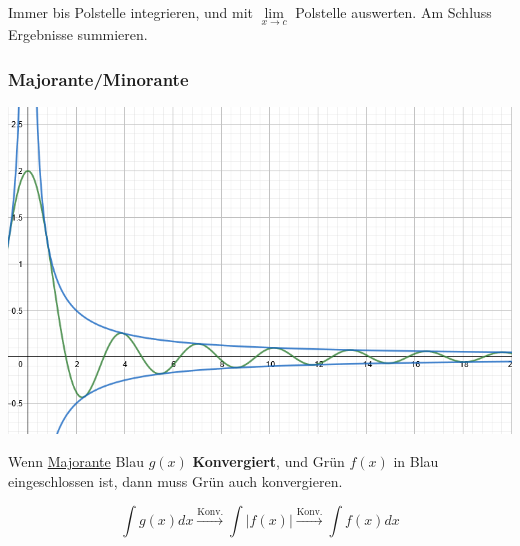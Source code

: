 \noindent Immer bis Polstelle integrieren, und mit $\lim\limits_{x\rightarrow c}$ Polstelle auswerten. Am Schluss Ergebnisse summieren.

\subsubsection{Majorante/Minorante}
\begin{center}
	\begin{minipage}{0.2\textwidth}
		\includegraphics[width=\linewidth]{Images/majorante}
	\end{minipage}%
	\begin{minipage}{0.25\textwidth}
		\noindent Wenn \underline{Majorante} Blau $g(x)$ \textbf{Konvergiert}, und Grün $f(x)$ in Blau eingeschlossen ist, dann muss Grün auch konvergieren.
	\end{minipage}
\end{center}
\[\int g(x)dx \xrightarrow{\text{Konv.}} \int\left|f(x)\right| \xrightarrow{\text{Konv.}} \int f(x)dx \]

